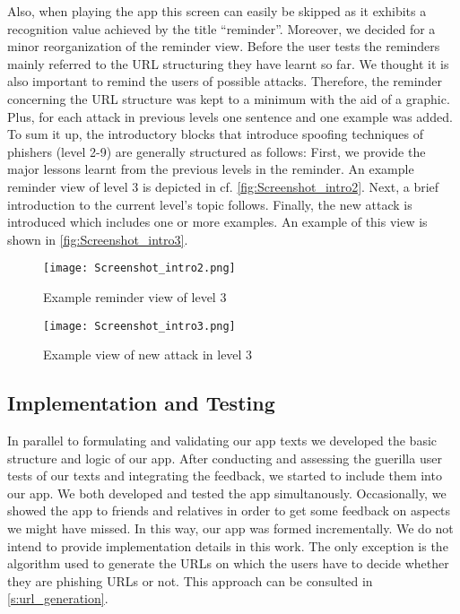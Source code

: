 Also, when playing the app this screen can easily be skipped as it exhibits a recognition value achieved by the title ``reminder''. 
Moreover, we decided for a minor reorganization of the reminder view. 
Before the user tests the reminders mainly referred to the URL structuring they have learnt so far. 
We thought it is also important to remind the users of possible attacks. 
Therefore, the reminder concerning the URL structure was kept to a minimum with the aid of a graphic. 
Plus, for each attack in previous levels one sentence and one example was added.  
To sum it up, the introductory blocks that introduce spoofing techniques of phishers (level 2-9) are generally structured as follows:
First, we provide the major lessons learnt from the previous levels in the reminder.
An example reminder view of level 3 is depicted in  cf. \autoref{fig:Screenshot_intro2}.
Next, a brief introduction to the current level's topic follows.
Finally, the new attack is introduced which includes one or more examples.
An example of this view is shown in \autoref{fig:Screenshot_intro3}.

\begin{figure}[hHtbp]
\centering
\texttt{[image: Screenshot\_intro2.png]}
\caption{Example reminder view of level 3}
\label{fig:Screenshot_intro2}
\end{figure}


\begin{figure}[hHtbp]
\centering
\texttt{[image: Screenshot\_intro3.png]}
\caption{Example view of new attack in level 3}
\label{fig:Screenshot_intro3}
\end{figure}

\subsection{Implementation and Testing}
In parallel to formulating and validating our app texts we developed the basic structure and logic of our app.
After conducting and assessing the guerilla user tests of our texts and integrating the feedback, we started to include them into our app.
We both developed and tested the app simultanously.
Occasionally, we showed the app to friends and relatives in order to get some feedback on aspects we might have missed.
In this way, our app was formed incrementally. 
We do not intend to provide implementation details in this work.
The only exception is the algorithm used to generate the URLs on which the users have to decide whether they are phishing URLs or not. This approach can be consulted in \autoref{s:url_generation}.
